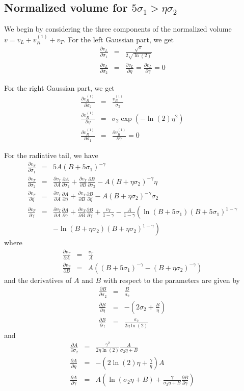 \documentclass[a4paper]{article}
\newcommand{\D}[2]{\frac{\partial #1}{\partial #2}}
\begin{document}
\subsection{Normalized volume for $5\sigma_1 > \eta\sigma_2$}
We begin by considering the three components of the normalized volume $v = v_L + v_R^{(1)} + v_T$.
For the left Gaussian part, we get
\begin{eqnarray}
\D{v_L}{\sigma_1} &=& \frac{\sqrt{\pi}}{2 \sqrt{\ln(2)}}\\
\D{v_L}{\sigma_2} &=& \D{v_L}{\eta} = \D{v_L}{\gamma} = 0
\end{eqnarray}

For the right Gaussian part, we get
\begin{eqnarray}
\D{v_R^{(1)}}{\sigma_2} &=& \frac{v_R^{(1)}}{\sigma_2}\\
\D{v_R^{(1)}}{\eta} &=& \sigma_2 \exp(-\ln(2) \eta^2)\\
\D{v_R^{(1)}}{\sigma_1} &=& \D{v_R^{(1)}}{\gamma} = 0
\end{eqnarray}

For the radiative tail, we have
\begin{eqnarray}
\D{v_T}{\sigma_1} &=& 5A (B + 5\sigma_1)^{-\gamma}\\
\D{v_T}{\sigma_2} &=& \D{v_T}{A} \D{A}{\sigma_2} + \D{v_T}{B} \D{B}{\sigma_2} - A(B + \eta\sigma_2)^{-\gamma} \eta\\
\D{v_T}{\eta} &=& \D{v_T}{A} \D{A}{\eta} + \D{v_T}{B} \D{B}{\eta} - A(B + \eta\sigma_2)^{-\gamma} \sigma_2\\
\D{v_T}{\gamma} &=& \D{v_T}{A} \D{A}{\gamma} + \D{v_T}{B} \D{B}{\gamma}
+ \frac{v_T}{1-\gamma} -\frac{A}{1-\gamma}\left(\ln(B + 5\sigma_1)(B + 5\sigma_1)^{1-\gamma}
\right.\nonumber\\&&\left.- \ln(B + \eta\sigma_2)(B + \eta\sigma_2)^{1-\gamma}\right)
\end{eqnarray}
where
\begin{eqnarray}
\D{v_T}{A} &=& \frac{v_T}{A}\\
\D{v_T}{B} &=& A \left( (B + 5\sigma_1)^{-\gamma} - (B + \eta\sigma_2)^{-\gamma} \right)
\end{eqnarray}
and the derivatives of $A$ and $B$ with respect to the parameters are given by
\begin{eqnarray}
\D{B}{\sigma_2} &=& \frac{B}{\sigma_2}\\
\D{B}{\eta} &=& -\left(2 \sigma_2 + \frac{B}{\eta}\right)\\
\D{B}{\gamma} &=& \frac{\sigma_2}{2 \eta \ln(2)}
\end{eqnarray}
and
\begin{eqnarray}
\D{A}{\sigma_2} &=& \frac{\gamma^2}{2 \eta \ln(2)} \frac{A}{\sigma_2 \eta + B}\\
\D{A}{\eta} &=& -\left(2 \ln(2) \eta + \frac{\gamma}{\eta}\right) A\\
\D{A}{\gamma} &=& A \left(\ln(\sigma_2\eta + B) + \frac{\gamma}{\sigma_2 \eta + B}\D{B}{\gamma}\right)
\end{eqnarray}
\end{document}
